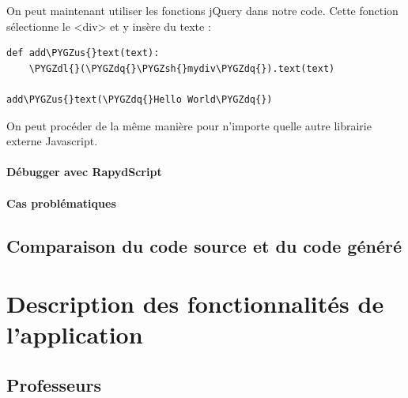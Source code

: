 \documentclass[letterpaper,10pt,french]{sphinxmanual}
\def\PYGZus{\char`\_}
\def\PYGZsh{\char`\#}
\def\PYGZdl{\char`\$}
\def\PYGZdq{\char`\"}
\begin{document}
On peut maintenant utiliser les fonctions jQuery dans notre code. Cette fonction sélectionne le \textless{}div\textgreater{} et y insère du texte :

\begin{Verbatim}[commandchars=\\\{\}]
def add\PYGZus{}text(text):
    \PYGZdl{}(\PYGZdq{}\PYGZsh{}mydiv\PYGZdq{}).text(text)

add\PYGZus{}text(\PYGZdq{}Hello World\PYGZdq{})
\end{Verbatim}

On peut procéder de la même manière pour n'importe quelle autre librairie externe Javascript.


\subsubsection{Débugger avec RapydScript}
\label{rapydscript:debugger-avec-rapydscript}

\subsubsection{Cas problématiques}
\label{rapydscript:cas-problematiques}

\section{Comparaison du code source et du code généré}
\label{rapydscript:comparaison-du-code-source-et-du-code-genere}

\chapter{Description des fonctionnalités de l'application}
\label{functionalities:description-des-fonctionnalites-de-l-application}\label{functionalities::doc}

\section{Professeurs}
\label{functionalities:professeurs}
\end{document}
